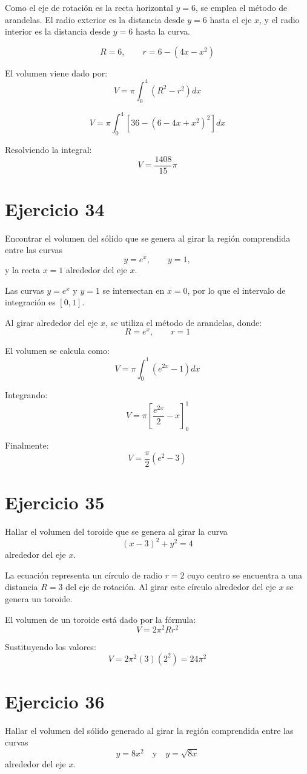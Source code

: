 \documentclass[12pt]{article}
\begin{document}
Como el eje de rotación es la recta horizontal $y = 6$, se emplea el método de arandelas. El radio exterior es la distancia desde $y=6$ hasta el eje $x$, y el radio interior es la distancia desde $y=6$ hasta la curva.

\[
R = 6, \qquad r = 6 - (4x - x^2)
\]

El volumen viene dado por:
\[
V = \pi \int_{0}^{4} \left(R^2 - r^2\right) dx
\]

\[
V = \pi \int_{0}^{4} \left[36 - (6 - 4x + x^2)^2\right] dx
\]

Resolviendo la integral:
\[
V = \frac{1408}{15}\pi
\]

\section*{Ejercicio 34}
Encontrar el volumen del sólido que se genera al girar la región comprendida entre las curvas
\[
y = e^x, \qquad y = 1,
\]
y la recta $x = 1$ alrededor del eje $x$.

Las curvas $y=e^x$ y $y=1$ se intersectan en $x=0$, por lo que el intervalo de integración es $[0,1]$.

Al girar alrededor del eje $x$, se utiliza el método de arandelas, donde:
\[
R = e^x, \qquad r = 1
\]

El volumen se calcula como:
\[
V = \pi \int_{0}^{1} \left(e^{2x} - 1\right) dx
\]

Integrando:
\[
V = \pi \left[ \frac{e^{2x}}{2} - x \right]_{0}^{1}
\]

Finalmente:
\[
V = \frac{\pi}{2}(e^2 - 3)
\]

\section*{Ejercicio 35}
Hallar el volumen del toroide que se genera al girar la curva
\[
(x - 3)^2 + y^2 = 4
\]
alrededor del eje $x$.

La ecuación representa un círculo de radio $r = 2$ cuyo centro se encuentra a una distancia $R = 3$ del eje de rotación. Al girar este círculo alrededor del eje $x$ se genera un toroide.

El volumen de un toroide está dado por la fórmula:
\[
V = 2\pi^2 R r^2
\]

Sustituyendo los valores:
\[
V = 2\pi^2 (3)(2^2) = 24\pi^2
\]

\section*{Ejercicio 36}
Hallar el volumen del sólido generado al girar la región comprendida entre las curvas
\[
y = 8x^2 \quad \text{y} \quad y = \sqrt{8x}
\]
alrededor del eje $x$.
\end{document}
